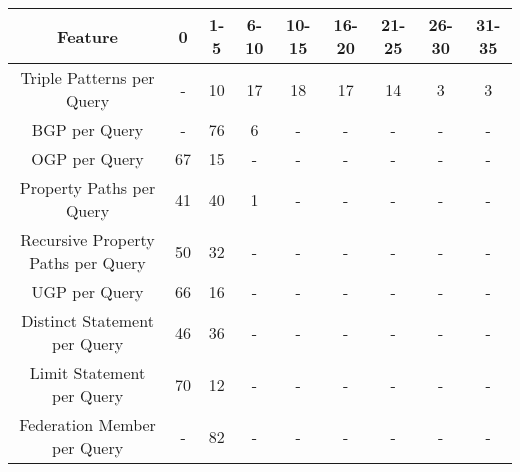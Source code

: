 \begin{center}
    \begin{tabular}{|*{9}{c|}}
     \hline
     Feature & 0 & 1-5 & 6-10 & 10-15 & 16-20 & 21-25 & 26-30 & 31-35 \\ 
     \hline \hline
     Triple Patterns per Query & - & 10 & 17 & 18 & 17 & 14 & 3 & 3 \\ 
     \hline
     BGP per Query & - & 76 & 6 & - & - & - & - & - \\ 
     \hline
     OGP per Query & 67 & 15 & - & - & - & - & - & - \\ 
     \hline
     Property Paths per Query & 41 & 40 & 1 & - & - & - & - & - \\ 
     \hline
     Recursive Property Paths per Query & 50 & 32 & - & - & - & - & - & - \\ 
     \hline
     UGP per Query & 66 & 16 & - & - & - & - & - & - \\ 
     \hline
     Distinct Statement per Query & 46 & 36 & - & - & - & - & - & - \\ 
     \hline
     Limit Statement per Query & 70 & 12 & - & - & - & - & - & - \\  
     \hline
     Federation Member per Query & - & 82 & - & - & - & - & - & - \\  
     \hline
    \end{tabular}
\end{center}